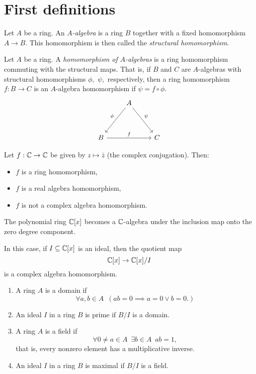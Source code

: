 \section{First definitions}

\begin{df}
  Let $A$ be a ring. An \textit{$A$-algebra} is a ring $B$ together with a fixed homomorphism
  \(A \to B.\)
  This homomorphism is then called the \textit{structural homomorphism}.
\end{df}

\begin{df}
  Let $A$ be a ring. A \textit{homomorphism of $A$-algebras} is a ring homomorphism commuting with the structural maps. That is, if \(B\) and \(C\) are $A$-algebras with structural homomorphisms \(\phi,\) \(\psi,\) respectively, then a ring homomorphism 
  $f:B \to C$
  is an \(A\)-algebra homomorphism if
  \(\psi = f \circ \phi.\)
  \begin{equation*}
    \begin{tikzcd}[row sep = huge]
      & A \arrow{dl}[swap]{\phi} \arrow{dr}{\psi} & \\
      B \arrow{rr}{f} && C
    \end{tikzcd}
  \end{equation*}
\end{df}

\begin{example}
  Let $f: \mathbb C \to \mathbb C$ be given by $z \mapsto \bar z$ (the complex conjugation). Then:
\begin{itemize}
\item \(f\) is a ring homomorphism,
\item \(f\) is a real algebra homomorphism,
\item \(f\) is not a complex algebra homomorphism.
\end{itemize}
\end{example}

\begin{example}
  The polynomial ring $\mathbb C [x]$ becomes a $\mathbb C$-algebra under the inclusion map onto the zero degree component.

  In this case, if $I \subseteq \mathbb C[x]$ is an ideal, then 
  the quotient map
  \[ \mathbb C[x] \to \mathbb C[x]/{I}\]
  is a complex algebra homomorphism.
\end{example}

\begin{df}
\mbox{}
\begin{enumerate}
\item A ring $A$ is a domain if
  \[\forall a,b \in A \enspace ( ab = 0 \implies a = 0 \lor b = 0. )\]
\item An ideal $I$ in a ring $B$ is prime if $B/{I}$ is a domain.
\item A ring $A$ is a field if
  \[\forall 0 \neq a \in A \enspace \exists b \in A \enspace ab = 1,\] that is, every nonzero element has a multiplicative inverse.
\item An ideal $I$ in a ring $B$ is maximal if $B/{I}$ is a field.
\end{enumerate}
\end{df}

